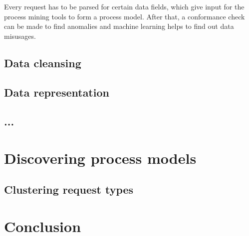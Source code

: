 \documentclass[a4paper, 12pt]{article}
\let\stdsection\section
\renewcommand\section{\newpage\stdsection}
\begin{document}
Every request has to be parsed for certain data fields, which give input for the process mining tools to form a process model. After that, a conformance check can be made to find anomalies and machine learning helps to find out data misusages. 

\subsection{Data cleansing}

\subsection{Data representation}

\subsection{...}

\section{Discovering process models}

\subsection{Clustering request types}


\section{Conclusion}
\label{Conclusion} 
\pagebreak


\footnotesize
{}
\end{document}
